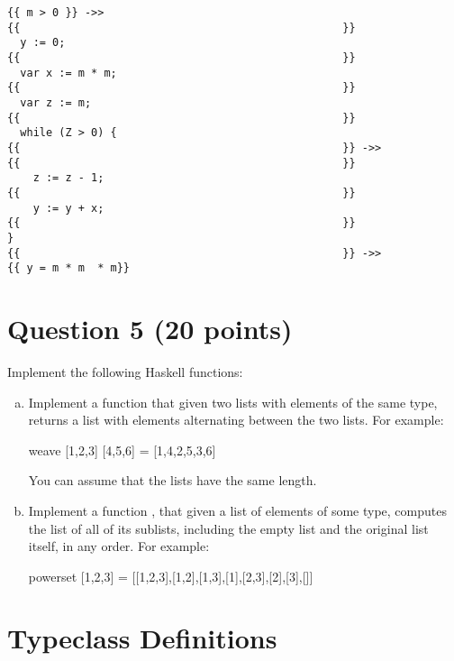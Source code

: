 \documentclass{article}
\begin{document}
\begin{verbatim}
{{ m > 0 }} ->> 
{{                                                  }}
  y := 0;
{{                                                  }}
  var x := m * m;
{{                                                  }}
  var z := m;
{{                                                  }}
  while (Z > 0) {
{{                                                  }} ->>
{{                                                  }}
    z := z - 1;
{{                                                  }}
    y := y + x;
{{                                                  }} 
}
{{                                                  }} ->>
{{ y = m * m  * m}}
\end{verbatim}


\pagebreak
\section*{Question 5 (20 points)}

Implement the following Haskell functions:

\begin{enumerate}[(a)]
\item Implement a function  that given two lists with
  elements of the same type, returns a list with elements alternating
  between the two lists. For example:
  \begin{hask}
    weave [1,2,3] [4,5,6] = [1,4,2,5,3,6]
  \end{hask}
  You can assume that the lists have the same length.
  \vspace*{20em}
  
\item Implement a function , that given a list of
  elements of some type, computes the list of all of its sublists,
  including the empty list and the original list itself,
  in any order.
  For example:
  \begin{hask}
    powerset [1,2,3] = [[1,2,3],[1,2],[1,3],[1],[2,3],[2],[3],[]]
  \end{hask}
 
% 
\end{enumerate}

\pagebreak

\section*{Typeclass Definitions}
\end{document}

